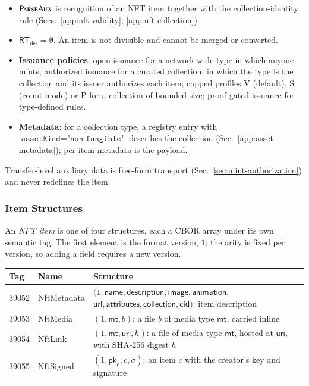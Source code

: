 \begin{itemize}
	\item $\Call{ParseAux}{}$ is recognition of an NFT item together with the collection-identity rule (Secs.~\ref{app:nft-validity}, \ref{app:nft-collection}).
	\item $\mathsf{RT}_\mathsf{der} = \emptyset$. An item is not divisible and cannot be merged or converted.
	\item \textbf{Issuance policies}: open issuance for a network-wide type in which anyone mints; authorized issuance for a curated collection, in which the type is the collection and its issuer authorizes each item; capped profiles V (default), S (count mode) or P for a collection of bounded size; proof-gated issuance for type-defined rules.
	\item \textbf{Metadata}: for a collection type, a registry entry with $\texttt{assetKind} = \texttt{"non-fungible"}$ describes the collection (Sec.~\ref{app:asset-metadata}); per-item metadata is the payload.
\end{itemize}

Transfer-level auxiliary data is free-form transport (Sec.~\ref{sec:mint-authorization}) and never redefines the item.

\subsubsection{Item Structures}\label{app:nft-items}

An \emph{NFT item} is one of four structures, each a CBOR array under its own semantic tag. The first element is the format version, $1$; the arity is fixed per version, so adding a field requires a new version.

\begin{longtable}{llp{9.2cm}}
\textbf{Tag} & \textbf{Name} & \textbf{Structure} \\
\hline
\endhead
39052 & NftMetadata & $(1, \mathsf{name}, \mathsf{description}, \mathsf{image}, \mathsf{animation},$\newline\hspace*{1em}$\mathsf{url}, \mathsf{attributes}, \mathsf{collection}, \mathsf{cid})$: item description \\
39053 & NftMedia & $(1, \mathsf{mt}, b)$: a file $b$ of media type $\mathsf{mt}$, carried inline \\
39054 & NftLink & $(1, \mathsf{mt}, \mathsf{uri}, h)$: a file of media type $\mathsf{mt}$, hosted at $\mathsf{uri}$, with SHA-256 digest $h$ \\
39055 & NftSigned & $(1, \mathsf{pk}_\mathsf{c}, c, \sigma)$: an item $c$ with the creator's key and signature \\
\end{longtable}

